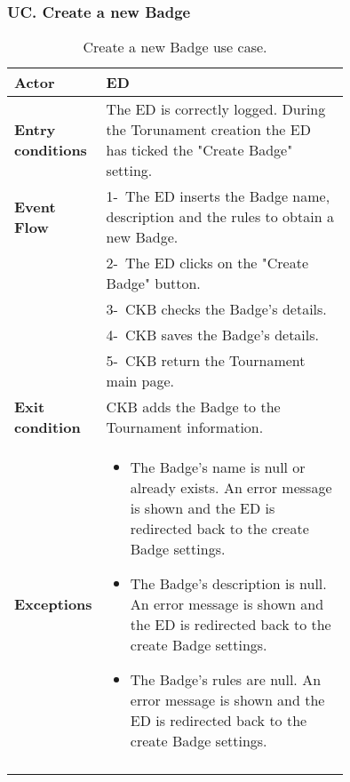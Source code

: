 \newpage

\subsubsection*{UC\cuc . Create a new Badge}
\begin{center}
    \begin{longtable}{|l|p{0.75\linewidth}|}
        \hline
        \textbf{Actor}            & ED \\
        \hline
        \textbf{Entry conditions} & The ED is correctly logged. During the Torunament creation the ED has ticked the "Create Badge" setting.        \\
        \hline
        \textbf{Event Flow}      
        & 1-\ The ED inserts the Badge name, description and the rules to obtain a new Badge. \\
        & 2-\ The ED clicks on the "Create Badge" button. \\
        & 3-\ CKB checks the Badge's details. \\
        & 4-\ CKB saves the Badge's details. \\
        & 5-\ CKB return the Tournament main page. \\
        \hline
        \textbf{Exit condition}   & CKB adds the Badge to the Tournament information.      \\
        \hline
        \textbf{Exceptions}        & \begin{itemize}
            \item The Badge's name is null or already exists. An error message is shown and the ED is redirected back to the create Badge settings.
            \item The Badge's description is null. An error message is shown and the ED is redirected back to the create Badge settings.
            \item The Badge's rules are null. An error message is shown and the ED is redirected back to the create Badge settings.
         \end{itemize}    \\
        \hline
        \caption{Create a new Badge use case.}
        \label{tab: create_a_badge_use_case}
    \end{longtable}
\end{center}


